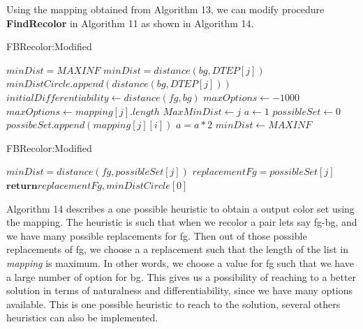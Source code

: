 Using the mapping obtained from Algorithm 13, we can modify procedure \textbf{FindRecolor} in Algorithm 11 as shown in Algorithm 14. 

\begin{algorithm}[!htb]
\caption{FBRecolor:Modified}\label{Minimum contrast included}
\begin{algorithmic}[1]
\State $minDist = MAXINF$
		\State $minDist = distance(bg,DTEP[j])$
	\EndIf
\EndFor
{}
		\State $minDistCircle .append(distance(bg,DTEP[j]))$
	\EndIf
\EndFor
\State $initialDifferentiability \gets distance(fg,bg)$
\State $maxOptions \gets -1000$
		  
		\State	$maxOptions \gets mapping[j].length$
		\State	$MaxMinDist \gets j$
		\EndIf
\EndFor
\State $a \gets 1$
\State $possibleSet \gets 0$
			\State $possibeSet.append(mapping[j][i])$
		\EndIf
		\State $a = a*2$
	\EndFor
\EndWhile
\State $minDist \gets MAXINF$
\end{algorithmic}
\end{algorithm}

\begin{algorithm}[!htb]
\caption{FBRecolor:Modified}\label{Minimum contrast included}
\begin{algorithmic}[1]
		\State $minDist = distance(fg,possibleSet[j])$
		\State $replacementFg = possibleSet[j]$
	\EndIf
\EndFor
\State $\textbf{return} replacementFg,minDistCircle[0]$
\EndProcedure
\end{algorithmic}
\end{algorithm}

Algorithm 14 describes a one possible heuristic to obtain a output color set using the mapping. The heuristic is such that when we recolor a pair lets say fg-bg, and we have many possible replacements for fg. Then out of those possible replacements of fg, we choose a a replacement such that the length of the list in \textit{mapping} is maximum. In other words, we choose a value for fg such that we have a large number of option for bg. This gives us a possibility of reaching to a better solution in terms of naturalness and differentiability, since we have many options available. This is one possible heuristic to reach to the solution, several others heuristics can also be implemented. 

